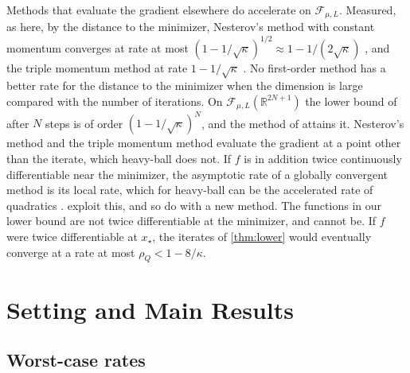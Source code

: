 \documentclass[11pt, a4paper]{article}
\theoremstyle{definition}
\newcommand{\R}{\mathbb{R}}
\newcommand{\F}{\mathcal{F}_{\mu,L}}
\begin{document}
Methods that evaluate the gradient elsewhere do accelerate on $\F$. Measured, as here, by the distance to the
minimizer, Nesterov's method \citep{nesterov1983method} with constant momentum converges at rate at most
$(1-1/\sqrt\kappa)^{1/2}\approx1-1/(2\sqrt\kappa)$ \citep[§2.2.1]{nesterov2018lectures}, and the triple momentum method at
rate $1-1/\sqrt\kappa$ \citep{vanscoy2018fastest}. No first-order method has a better rate for the distance to the
minimizer when the dimension is large compared with the number of iterations. On $\F(\R^{2N+1})$ the lower bound of \citet{drori2022oracle} after $N$ steps is of order
$(1-1/\sqrt\kappa)^N$, and the method of \citet{taylor2023optimal} attains it. Nesterov's method and the triple momentum
method evaluate the gradient at a point other than the iterate, which heavy-ball does not. If $f$ is in addition twice
continuously differentiable near the minimizer, the asymptotic rate of a globally convergent method is its local rate,
which for heavy-ball can be the accelerated rate of quadratics \citep{polyak1964some}. 
exploit this, and so do \citet{vanscoy2025fastest} with a new method. The functions in our lower bound are not twice
differentiable at the minimizer, and cannot be. If $f$ were twice differentiable at $x_\star$, the iterates of
\cref{thm:lower} would eventually converge at a rate at most $\rho_Q<1-8/\kappa$.

\section{Setting and Main Results}
\label{sec:setting}

\subsection{Worst-case rates}
\end{document}

